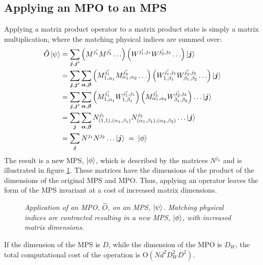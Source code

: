 \subsection{Applying an MPO to an MPS}
Applying a matrix product operator to a matrix product state is simply a matrix multiplication, where the matching physical indices are summed over:
\begin{align}
	\hat{O} \ket{\psi} &= \sum_{\boldsymbol{j},\boldsymbol{j'}} \left( M^{ j_1 '} M^{j_2 ' } \ldots \right) \left( W^{j_1 ' , j_1} W^{j_2 ' , j_2} \ldots \right) \ket{\boldsymbol{j}} \nonumber \\
	&= \sum_{\boldsymbol{j},\boldsymbol{j'}} \sum_{\boldsymbol{\alpha},\boldsymbol{\beta}} \left( M_{1, \alpha_1}^{ j_1 '} M_{\alpha_1, \alpha_2}^{j_2 '} \ldots \right) \left( W_{1, \beta_1}^{j_1 ' , j_1 } W_{\beta_1, \beta_2}^{j_2 ', j_2 } \ldots \right) \ket{\boldsymbol{j}} \nonumber \\
&= \sum_{\boldsymbol{j},\boldsymbol{j'}} \sum_{\boldsymbol{\alpha},\boldsymbol{\beta}} \left( M_{1, \alpha_1}^{ j_1 '} W_{1, \beta_1}^{j_1 ' , j_1} \right) \left( M_{\alpha_1, \alpha_2}^{j_2 '}  W_{\beta_1, \beta_2}^{j_2 ' , j_2} \right) \ldots \ket{\boldsymbol{j}} \nonumber \\
&= \sum_{\boldsymbol{j}} \sum_{\boldsymbol{\alpha},\boldsymbol{\beta}} N_{(1,1),(\alpha_1 , \beta_1)}^{j_1} N_{(\alpha_1 , \beta_1),(\alpha_2 , \beta_2)}^{j_2} \ldots \ket{\boldsymbol{j}} \nonumber \\
&= \sum_{\boldsymbol{j}} N^{j_1} N^{j_2} \ldots \ket{\boldsymbol{j}} \; = \; \ket{\phi}
\label{eq:optBracketsMPO}
\end{align} 
The result is a new MPS, $\ket{\phi}$, which is described by the matrices $N^{j_n}$ and is illustrated in figure \ref{fig:MPOcont}. These matrices have the dimensions of the product of the dimensions of the original MPS and MPO. Thus, applying an operator leaves the form of the MPS invariant at a cost of increased matrix dimensions.
\begin{figure}[h!]
	\centering
	
	\caption{\textit{Application of an MPO, $\hat{O}$, on an MPS, $\ket{\psi}$. Matching physical indices are contracted resulting in a new MPS, $\ket{\phi}$, with increased matrix dimensions.}}
	\label{fig:MPOcont}
\end{figure}
If the dimension of the MPS is $D$, while the dimension of the MPO is $D_W$, the total computational cost of the operation is $\mathrm{O}(N d^2 D_W ^2 D^2)$.\cite{Schollwock, McCulloch}

